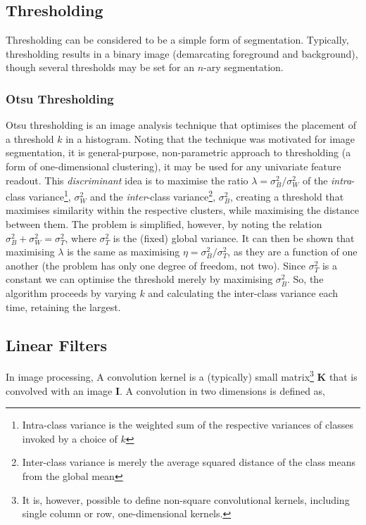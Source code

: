 \documentclass[11pt]{amsart}
\begin{document}
\subsection{Thresholding}

Thresholding can be considered to be a simple form of segmentation. Typically, thresholding results in a binary image (demarcating foreground and background), though several thresholds may be set for an $n$-ary segmentation.

\subsubsection{Otsu Thresholding}

Otsu thresholding is an image analysis technique that optimises the placement of a threshold $k$ in a histogram. Noting that the technique was motivated for image segmentation, it is general-purpose, non-parametric approach to thresholding (a form of one-dimensional clustering), it may be used for any univariate feature readout. This \emph{discriminant} idea is to maximise the ratio $\lambda = \sigma^2_B / \sigma^2_W$ of the \emph{intra}-class variance\footnote{Intra-class variance is the weighted sum of the respective variances of classes invoked by a choice of $k$}, $\sigma^2_W$ and the \emph{inter}-class variance\footnote{Inter-class variance is merely the average squared distance of the class means from the global mean}, $\sigma^2_B$, creating a threshold that maximises similarity within the respective clusters, while maximising the distance between them. The problem is simplified, however, by noting the relation $\sigma^2_B + \sigma^2_W = \sigma^2_T$, where $\sigma^2_T$ is the (fixed) global variance. It can then be shown that maximising $\lambda$ is the same as maximising $\eta = \sigma^2_B / \sigma^2_T$, as they are a function of one another (the problem has only one degree of freedom, not two). Since $\sigma^2_T$ is a constant we can optimise the threshold merely by maximising $\sigma^2_B$. So, the algorithm proceeds by varying $k$ and calculating the inter-class variance each time, retaining the largest.

\subsection{Linear Filters}

In image processing, A convolution kernel is a (typically) small matrix\footnote{It is, however, possible to define non-square convolutional kernels, including single column or row, one-dimensional kernels.} $\mathbf{K}$ that is convolved with an image $\mathbf{I}$. A convolution in two dimensions is defined as,
\end{document}
